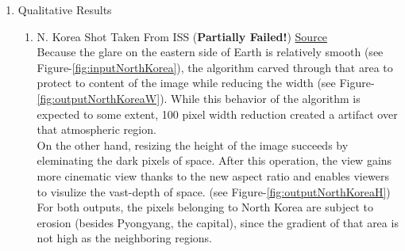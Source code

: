 \documentclass{article}
\begin{document}
\begin{enumerate}
	\item Qualitative Results
	\begin{enumerate}
		\item N. Korea Shot Taken From ISS (\textbf{Partially Failed!})	\href{https://www.nasa.gov/mission_pages/station/research/news/crowdsourcing_night_images}{Source}
		\\ Because the glare on the eastern side of Earth is relatively smooth (see
		Figure-\ref{fig:inputNorthKorea}), the algorithm carved through that area to
		protect to content of the image while reducing the width (see
		Figure-\ref{fig:outputNorthKoreaW}). While this behavior of the algorithm is
		expected to some extent, 100 pixel width reduction created a artifact over that atmospheric region. \\
		On the other hand, resizing the height of the image succeeds by eleminating
		the dark pixels of space. After this operation, the view gains more cinematic
		view thanks to the new aspect ratio and enables viewers to visulize the
		vast-depth of space. (see Figure-\ref{fig:outputNorthKoreaH}) \\
		For both outputs, the pixels belonging to North Korea are subject to erosion
		(besides Pyongyang, the capital), since the gradient of that area is not high
		as the neighboring regions.	\\	

\end{enumerate}
\end{enumerate}
\end{document}
